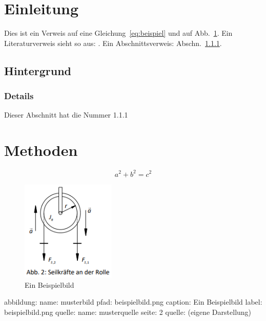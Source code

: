 \documentclass[12pt,a4paper]{article}
\numberwithin{equation}{section}
\newcommand{\figref}[1]{Abb.~\ref{#1}}
\newcommand{\secref}[1]{Abschn.~\ref{#1}}
\begin{document}
\tableofcontents

\section{Einleitung}

Dies ist ein Verweis auf eine Gleichung~\eqref{eq:beispiel} und auf \figref{fig:beispielbild}.  
Ein Literaturverweis sieht so aus: \cite[][S.~2]{musterquelle}.  
Ein Abschnittsverweis: \secref{Details}.

\subsection{Hintergrund}
\subsubsection{Details}
\label{Details}
Dieser Abschnitt hat die Nummer 1.1.1

\section{Methoden}

\begin{equation}
    a^2 + b^2 = c^2
    \label{eq:beispiel}
\end{equation}

\begin{figure}[h]
    \centering
    \includegraphics[width=0.4\textwidth]{beispielbild.png}
    \caption{Ein Beispielbild}
    \label{fig:beispielbild}
\end{figure}

abbildung:
    name: musterbild
    pfad: beispielbild.png
    caption: Ein Beispielbild
    label: beispielbild.png
    quelle:
        name: musterquelle
        seite: 2
    quelle: (eigene Darstellung)


\printbibliography
\end{document}
